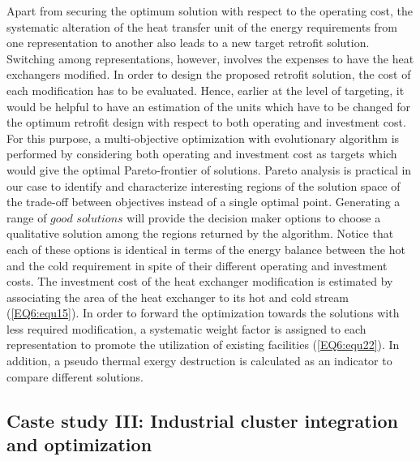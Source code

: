 Apart from securing the optimum solution with respect to the operating cost, the systematic alteration of the heat transfer unit of the energy requirements from one representation to another also leads to a new target retrofit solution. Switching among representations, however, involves the expenses to have the heat exchangers modified. In order to design the proposed retrofit solution, the cost of each modification has to be evaluated. Hence, earlier at the level of targeting, it would be helpful to have an estimation of the units which have to be changed for the optimum retrofit design with respect to both operating and investment cost. For this purpose, a multi-objective optimization with evolutionary algorithm \cite{Molyneaux2010751} is performed by considering both operating and investment cost as targets which would give the optimal Pareto-frontier of solutions. Pareto analysis is practical in our case to identify and characterize interesting regions of the solution space of the trade-off between objectives instead of a single optimal point. Generating a range of $good$ $solutions$ will provide the decision maker options to choose a qualitative solution among the regions returned by the algorithm. Notice that each of these options is identical in terms of the energy balance between the hot and the cold requirement in spite of their different operating and investment costs. The investment cost of the heat exchanger modification is estimated by associating the area of the heat exchanger to its hot and cold stream (\cref{EQ6:equ15}). In order to forward the optimization towards the solutions with less required modification, a systematic weight factor is assigned to each representation to promote the utilization of existing facilities (\cref{EQ6:equ22}). In addition, a pseudo thermal exergy destruction is calculated as an indicator to compare different solutions. 

\subsection{Caste study III: Industrial cluster integration and optimization}